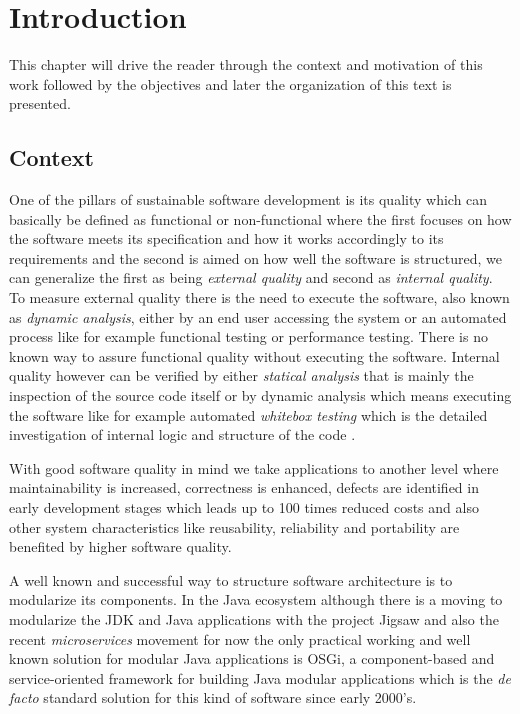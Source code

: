 \chapter{Introduction}
 This chapter will drive the reader through the context and motivation of this work followed by the objectives and later the organization of this text is presented.  
 

\section{Context}

One of the pillars of sustainable software development is its quality which can basically be defined as functional or non-functional where the first focuses on how the software meets its specification and how it works accordingly to its requirements and the second is aimed on how well the software is structured, we can generalize the first as being \emph{external quality} and second as \emph{internal quality}. To measure external quality there is the need to execute the software, also known as \emph{dynamic analysis}, either by an end user accessing the system or an automated process like for example functional testing or performance testing. There is no known way to assure functional quality without executing the software. Internal quality however can be verified by either \emph{statical analysis} that is mainly the inspection of the source code itself or by dynamic analysis which means executing the software like for example automated \emph{whitebox testing} which is the detailed
investigation of internal logic and structure of the code \citep{Khan&khan 2012}.   

With good software quality in mind we take applications to another level where maintainability is increased, correctness is enhanced, defects are identified in early development stages which leads up to 100 times reduced costs \citep{Beohm&Basili 2001} and also other system characteristics like reusability, reliability and portability are benefited by higher software quality.  

A well known and successful way to structure software architecture is to modularize its components. In the Java ecosystem although there is a moving to modularize the JDK and Java applications with the project Jigsaw \citep{Krill 2012} and also the recent \emph{microservices} movement \citep{Knorr 2014} for now the only practical working and well known solution for modular Java applications is OSGi, a component-based and service-oriented framework for building Java modular applications which is the \emph{de facto} standard solution for this kind of software since early 2000's. 

